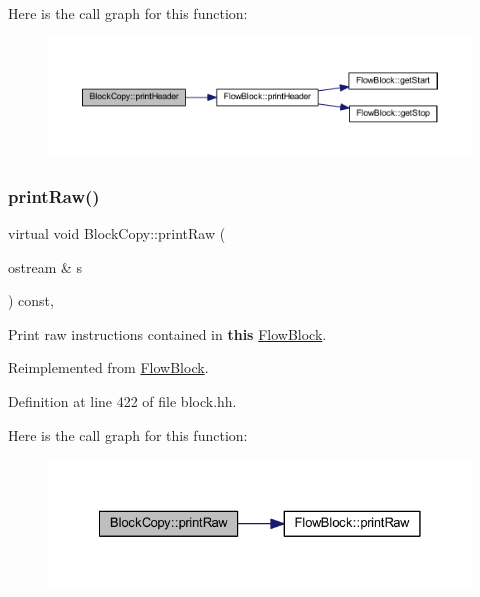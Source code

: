 Here is the call graph for this function\+:
\nopagebreak
\begin{figure}[H]
\begin{center}
\leavevmode
\includegraphics[width=350pt]{class_block_copy_aa360ee1fda40a1cb2289cb92e615fb9c_cgraph}
\end{center}
\end{figure}
\mbox{\label{class_block_copy_aa648abadc84c98ba2d49902f9faac957}} 
\subsubsection{\texorpdfstring{printRaw()}{printRaw()}}
{\footnotesize\ttfamily virtual void Block\+Copy\+::print\+Raw (\begin{DoxyParamCaption}\item[{ostream \&}]{s }\end{DoxyParamCaption}) const\hspace{0.3cm}{\ttfamily [inline]}, {\ttfamily [virtual]}}



Print raw instructions contained in {\bfseries{this}} \mbox{\hyperlink{class_flow_block}{Flow\+Block}}. 



Reimplemented from \mbox{\hyperlink{class_flow_block_aa5bd09d25026872141e42118b03119b1}{Flow\+Block}}.



Definition at line 422 of file block.\+hh.

Here is the call graph for this function\+:
\nopagebreak
\begin{figure}[H]
\begin{center}
\leavevmode
\includegraphics[width=328pt]{class_block_copy_aa648abadc84c98ba2d49902f9faac957_cgraph}
\end{center}
\end{figure}
\mbox{\label{class_block_copy_ac44129ef866b5e09769f7962c1da928c}} 
